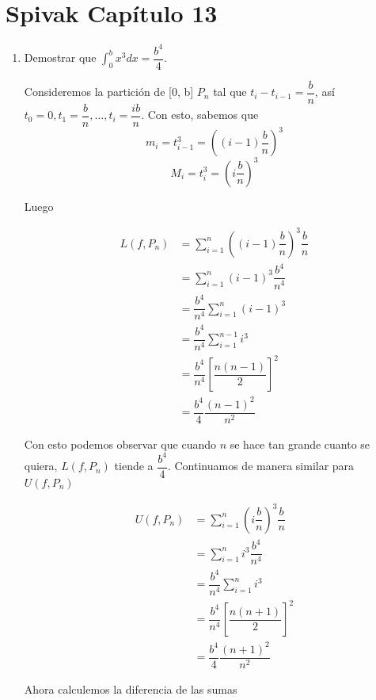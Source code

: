 \documentclass{report}
\begin{document}

    \chapter*{Spivak Capítulo 13}

    \begin{enumerate}
        \item Demostrar que $\int_{0}^{b}x^3dx = \dfrac{b^4}{4}$.

        Consideremos la partición de [0, b] $P_n$ tal que $t_i - t_{i-1} = \dfrac{b}{n}$, así $t_0 = 0, t_1 = \dfrac{b}{n}, \dots , t_i =\dfrac{ib}{n}$. Con esto, sabemos que
        $$m_i = t_{i-1}^3 = \left((i-1)\dfrac{b}{n}\right)^3$$
        $$M_i = t_{i}^3 = \left(i\dfrac{b}{n}\right)^3$$

        Luego

        \begin{align*}
            L(f, P_n) &= \sum_{i=1}^{n}\left((i-1)\dfrac{b}{n}\right)^3\dfrac{b}{n}\\
            &= \sum_{i=1}^{n}(i-1)^3\dfrac{b^4}{n^4}\\
            &= \dfrac{b^4}{n^4} \sum_{i=1}^{n}(i-1)^3\\
            &= \dfrac{b^4}{n^4} \sum_{i=1}^{n-1}i^3\\
            &= \dfrac{b^4}{n^4} \left[\dfrac{n(n-1)}{2}\right]^2\\
            &= \dfrac{b^4}{4} \dfrac{(n-1)^2}{n^2}
        \end{align*}

        Con esto podemos observar que cuando $n$ se hace tan grande cuanto se quiera, $L(f, P_n)$ tiende a $\dfrac{b^4}{4}$. Continuamos de manera similar para $U(f, P_n)$

        \begin{align*}
            U(f, P_n) &= \sum_{i=1}^{n}\left(i\dfrac{b}{n}\right)^3\dfrac{b}{n}\\
            &= \sum_{i=1}^{n}i^3\dfrac{b^4}{n^4}\\
            &= \dfrac{b^4}{n^4} \sum_{i=1}^{n}i^3\\
            &= \dfrac{b^4}{n^4} \left[\dfrac{n(n+1)}{2}\right]^2\\
            &= \dfrac{b^4}{4} \dfrac{(n+1)^2}{n^2}
        \end{align*}

        Ahora calculemos la diferencia de las sumas


\end{enumerate}
\end{document}
